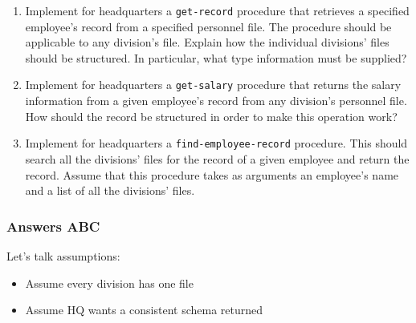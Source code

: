 \documentclass[final,fleqn,titlepage,twoside]{article}
\begin{document}
\begin{enumerate}
\item Implement for headquarters a \texttt{get-record} procedure that retrieves
a specified employee's record from a specified personnel file. The procedure
should be applicable to any division's file. Explain how the individual
divisions' files should be structured. In particular, what type information
must be supplied?

\item Implement for headquarters a \texttt{get-salary} procedure that returns
the salary information from a given employee's record from any division's
personnel file. How should the record be structured in order to make this
operation work?

\item Implement for headquarters a \texttt{find-employee-record} procedure. This
should search all the divisions' files for the record of a given employee and
return the record. Assume that this procedure takes as arguments an
employee's name and a list of all the divisions' files.
\end{enumerate}

\subsubsection{Answers ABC}
\label{sec:org7e79be9}
Let's talk assumptions:
\begin{itemize}
\item Assume every division has one file
\item Assume HQ wants a consistent schema returned
\end{itemize}
\end{document}
